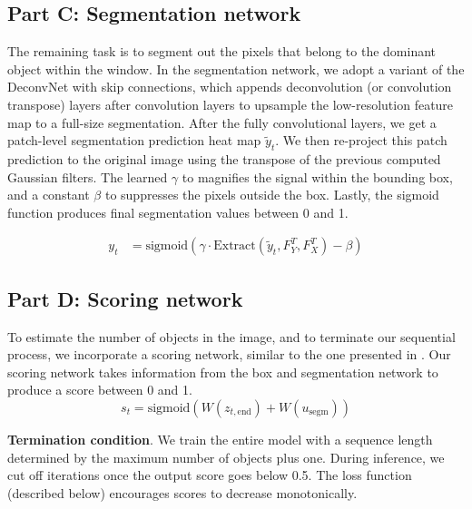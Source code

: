 \subsection{Part C: Segmentation network}

The remaining task is to segment out the pixels that belong to the dominant
object within the window. In the segmentation network, we adopt a variant of
the DeconvNet \cite{noh15deconv} with skip connections, which appends
deconvolution (or convolution transpose) layers after convolution layers to
upsample the low-resolution feature map to a full-size segmentation. After the
fully convolutional layers, we get a patch-level segmentation prediction heat
map $\tilde{y}_t$. We then re-project this patch prediction to the original
image using the transpose of the previous computed Gaussian filters. The
learned $\gamma$ to magnifies the signal within the bounding box, and a
constant $\beta$ to suppresses the pixels outside the box. Lastly, the sigmoid
function produces final segmentation values between 0 and 1.

\begin{align}
y_t &= \text{sigmoid} \left(
\gamma \cdot \text{Extract}(\tilde{y}_t, F_Y^T, F_X^T)
- \beta \right)
\end{align}

\subsection{Part D: Scoring network}

To estimate the number of objects in the image, and to terminate our sequential
process, we incorporate a scoring network, similar to the one presented in
\cite{romeraparedes15ris}. Our scoring network takes information from the box
and segmentation network to produce a score between 0 and 1.
\begin{equation}
s_{t} = \text{sigmoid}(W(z_{t, \text{end}}) + W(u_{\text{segm}}))
\end{equation}

\textbf{Termination condition}. We train the entire model with a sequence length
determined by the maximum number of objects plus one. During inference, we cut
off iterations once the output score goes below 0.5. The loss function
(described below) encourages scores to decrease monotonically.

